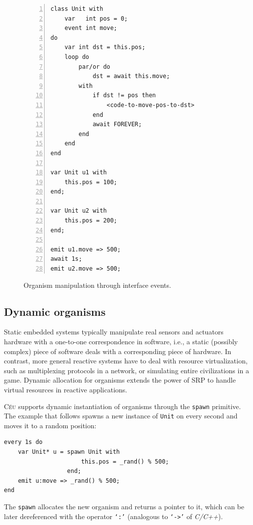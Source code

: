 \documentclass{acm_proc_article-sp}
\newcommand{\CEU}{\textsc{C\'{e}u}\xspace}
\newcommand{\code}[1] {{\small{\texttt{#1}}}}
\newcommand{\1}{\;}
\newcommand{\2}{\;\;}
\newcommand{\3}{\;\;\;}
\newcommand{\5}{\;\;\;\;\;}
\begin{document}
\begin{figure}[t]
\begin{lstlisting}[numbers=left,xleftmargin=3em]
class Unit with
    var   int pos = 0;
    event int move;
do
    var int dst = this.pos;
    loop do
        par/or do
            dst = await this.move;
        with
            if dst != pos then
                <code-to-move-pos-to-dst>
            end
            await FOREVER;
        end
    end
end

var Unit u1 with
    this.pos = 100;
end;

var Unit u2 with
    this.pos = 200;
end;

emit u1.move => 500;
await 1s;
emit u2.move => 500;
\end{lstlisting}
\caption{ Organism manipulation through interface events.
\label{lst.unit}
}
\end{figure}

\subsection{Dynamic organisms}

Static embedded systems typically manipulate real sensors and actuators 
hardware with a one-to-one correspondence in software, i.e., a static (possibly 
complex) piece of software deals with a corresponding piece of hardware.
%
In contrast, more general reactive systems have to deal with resource 
virtualization, such as multiplexing protocols in a network, or simulating 
entire civilizations in a game.
%
Dynamic allocation for organisms extends the power of SRP to handle virtual 
resources in reactive applications.

\CEU supports dynamic instantiation of organisms through the \code{spawn} 
primitive.
The example that follows spawns a new instance of \code{Unit} on
every second and moves it to a random position:

\begin{lstlisting}
every 1s do
    var Unit* u = spawn Unit with
                      this.pos = _rand() % 500;
                  end;
    emit u:move => _rand() % 500;
end
\end{lstlisting}

The \code{spawn} allocates the new organism and returns a pointer to it, which 
can be later dereferenced with the operator \code{`:'} (analogous to 
\code{`->'} of \emph{C/C++}).

\end{document}
